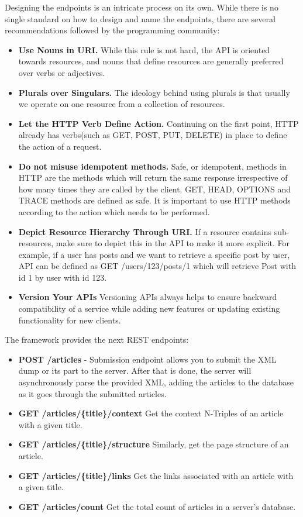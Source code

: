 \documentclass[thesis=M,english,hidelinks]{FITthesis}[2019/12/23]
\begin{document}
Designing the endpoints is an intricate process on its own. While there is no single standard on how to design and name the endpoints, there are several recommendations followed by the programming community\cite{REST_Design}:

\begin{itemize}
	\item \textbf{Use Nouns in URI.} While this rule is not hard, the API is oriented towards resources, and nouns that define resources are generally preferred over verbs or adjectives.
	\item \textbf{Plurals over Singulars.} The ideology behind using plurals is that usually we operate on one resource from a collection of resources.
	\item \textbf{Let the HTTP Verb Define Action.} Continuing on the first point, HTTP already has verbs(such as GET, POST, PUT, DELETE) in place to define the action of a request.
	\item \textbf{Do not misuse idempotent methods.} Safe, or idempotent, methods in HTTP are the methods which will return the same response irrespective of how many times they are called by the client. GET, HEAD, OPTIONS and TRACE methods are defined as safe. It is important to use HTTP methods according to the action which needs to be performed.
	\item \textbf{Depict Resource Hierarchy Through URI.} If a resource contains sub-resources, make sure to depict this in the API to make it more explicit. For example, if a user has posts and we want to retrieve a specific post by user, API can be defined as GET /users/123/posts/1 which will retrieve Post with id 1 by user with id 123.
	\item \textbf{Version Your APIs} Versioning APIs always helps to ensure backward compatibility of a service while adding new features or updating existing functionality for new clients.
\end{itemize}

The framework provides the next \gls{REST} endpoints:

\begin{itemize}
	\item \textbf{POST /articles} - Submission endpoint allows you to submit the XML dump or its part to the server. After that is done, the server will asynchronously parse the provided XML, adding the articles to the database as it goes through the submitted articles.
	\item \textbf{GET /articles/\{title\}/context} Get the context N-Triples of an article with a given title.
	\item \textbf{GET /articles/\{title\}/structure} Similarly, get the page structure of an article.
	\item \textbf{GET /articles/\{title\}/links} Get the links associated with an article with a given title.
	\item \textbf{GET /articles/count} Get the total count of articles in a server's database.
\end{itemize}
\end{document}
